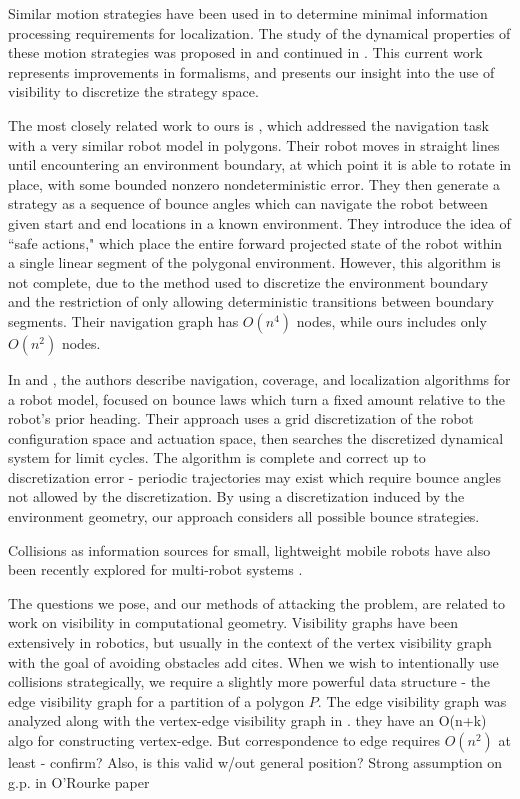 \documentclass[]{styles/svproc}  %
\begin{document}
Similar motion strategies have been used in \cite{OkaLav06} to determine minimal
information processing requirements for localization. The study of the dynamical
properties of these motion strategies was proposed in \cite{bounce} and
continued in \cite{NilBecLav17}. This current work represents improvements in
formalisms, and presents our insight into the use of visibility to discretize the
strategy space.

The most closely related work to ours is \cite{LewOKa13}, which addressed the
navigation task with a very similar robot model in polygons. Their robot moves
in straight lines until encountering an environment boundary, at which point it
is able to rotate in place, with some bounded nonzero nondeterministic error.
They then generate a strategy as a sequence of bounce angles which can navigate
the robot between given start and end locations in a known environment. They
introduce the idea of ``safe actions," which place the entire forward projected
state of the robot within a single linear segment of the polygonal environment.
However, this algorithm is not complete, due to the method used to discretize
the environment boundary and the restriction of only allowing deterministic
transitions between boundary segments. Their navigation graph has $O(n^4)$
nodes, while ours includes only $O(n^2)$ nodes.

In \cite{alam2017minimalist} and \cite{alam2018space}, the authors describe
navigation, coverage, and localization algorithms for a robot model, focused
on bounce laws which turn a fixed amount relative to the robot's prior heading. 
Their approach uses a grid discretization of the robot configuration space and actuation
space, then searches the discretized dynamical system for limit cycles. The
algorithm is complete and correct up to discretization error - periodic
trajectories may exist which require bounce angles not allowed by the
discretization. By using a discretization induced by the environment geometry,
our approach considers all possible bounce strategies.

Collisions as information sources for small, lightweight mobile robots have also been
recently explored for multi-robot systems \cite{mayya2017collisions}.


The questions we pose, and our methods of attacking the problem, are related to
work on visibility in computational geometry. Visibility graphs have been
extensively in robotics, but usually in the context of the vertex visibility
graph with the goal of avoiding obstacles {\color{red} add cites}. When we wish
to intentionally use collisions strategically, we require a slightly more
powerful data structure - the edge visibility graph for a partition of a polygon
$P$. The edge visibility graph was analyzed along with the vertex-edge
visibility graph in \cite{rourke_viz}. {\color{red} they have an O(n+k) algo for
constructing vertex-edge. But correspondence to edge requires $O(n^2)$ at least
- confirm? Also, is this valid w/out general position? Strong assumption on g.p.
in O'Rourke paper}
\end{document}
